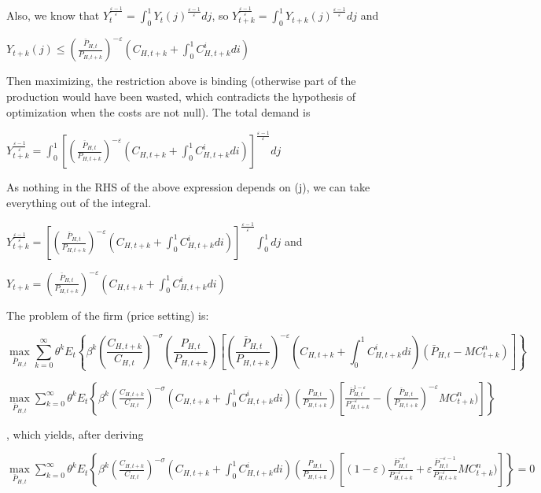 \documentclass[
]{article}
\begin{document}
Also, we know that
\(\displaystyle Y_t^{\frac{\varepsilon-1}{\varepsilon}} = \int_0^1Y_t(j)^{\frac{\varepsilon-1}{\varepsilon}}dj\),
so
\(\displaystyle Y_{t+k}^{\frac{\varepsilon-1}{\varepsilon}} = \int_0^1Y_{t+k}(j)^{\frac{\varepsilon-1}{\varepsilon}}dj\)
and

\(\displaystyle Y_{t+k}(j) \leq \left( \frac{\bar{P}_{H,t}}{P_{H,t+k}} \right)^{-\varepsilon} \left( C_{H,t+k}+\int_0^1C_{H,t+k}^i di\right)\)

Then maximizing, the restriction above is binding (otherwise part of the
production would have been wasted, which contradicts the hypothesis of
optimization when the costs are not null). The total demand is

\(\displaystyle Y_{t+k}^{\frac{\varepsilon-1}{\varepsilon}} = \int_0^1 \left[ \left( \frac{\bar{P}_{H,t}}{P_{H,t+k}} \right)^{-\varepsilon} \left( C_{H,t+k}+\int_0^1C_{H,t+k}^i di\right) \right]^{\frac{\varepsilon-1}{\varepsilon}} dj\)

As nothing in the RHS of the above expression depends on (j), we can
take everything out of the integral.

\(\displaystyle Y_{t+k}^{\frac{\varepsilon-1}{\varepsilon}} = \left[ \left( \frac{\bar{P}_{H,t}}{P_{H,t+k}} \right)^{-\varepsilon} \left( C_{H,t+k}+\int_0^1C_{H,t+k}^i di\right) \right]^{\frac{\varepsilon-1}{\varepsilon}} \int_0^1 dj\)
and

\(\displaystyle Y_{t+k} = \left( \frac{\bar{P}_{H,t}}{P_{H,t+k}} \right)^{-\varepsilon} \left( C_{H,t+k}+\int_0^1C_{H,t+k}^i di\right)\)

The problem of the firm (price setting) is:

\[\displaystyle \underset{\bar{P}_{H,t}} \max \sum_{k=0}^\infty \theta^kE_t \left\{\beta^k \left( \frac{C_{H,t+k}}{C_{H,t}} \right)^{-\sigma} \left( \frac{P_{H,t}}{P_{H,t+k}} \right) \left[ \left( \frac{\bar{P}_{H,t}}{P_{H,t+k}} \right)^{-\varepsilon} \left( C_{H,t+k}+\int_0^1C_{H,t+k}^i di\right) (\bar{P}_{H,t}-MC_{t+k}^n) \right] \right\}\]

\(\displaystyle \underset{\bar{P}_{H,t}} \max \sum_{k=0}^\infty \theta^kE_t \left\{\beta^k \left( \frac{C_{H,t+k}}{C_{H,t}} \right)^{-\sigma} \left( C_{H,t+k}+\int_0^1C_{H,t+k}^i di\right) \left( \frac{P_{H,t}}{P_{H,t+k}} \right) \left[\frac{\bar{P}_{H,t}^{1-\varepsilon}}{P_{H,t+k}^{-\varepsilon}} -\left( \frac{\bar{P}_{H,t}}{P_{H,t+k}} \right)^{-\varepsilon} MC_{t+k}^n) \right] \right\}\)

, which yields, after deriving

\(\displaystyle \underset{\bar{P}_{H,t}} \max \sum_{k=0}^\infty \theta^kE_t \left\{\beta^k \left( \frac{C_{H,t+k}}{C_{H,t}} \right)^{-\sigma} \left( C_{H,t+k}+\int_0^1C_{H,t+k}^i di\right) \left( \frac{P_{H,t}}{P_{H,t+k}} \right) \left[(1-\varepsilon)\frac{\bar{P}_{H,t}^{-\varepsilon}}{P_{H,t+k}^{-\varepsilon}} +\varepsilon \frac{\bar{P}_{H,t}^{-\varepsilon-1}}{P_{H,t+k}^{-\varepsilon}} MC_{t+k}^n) \right] \right\}=0\)
\end{document}

